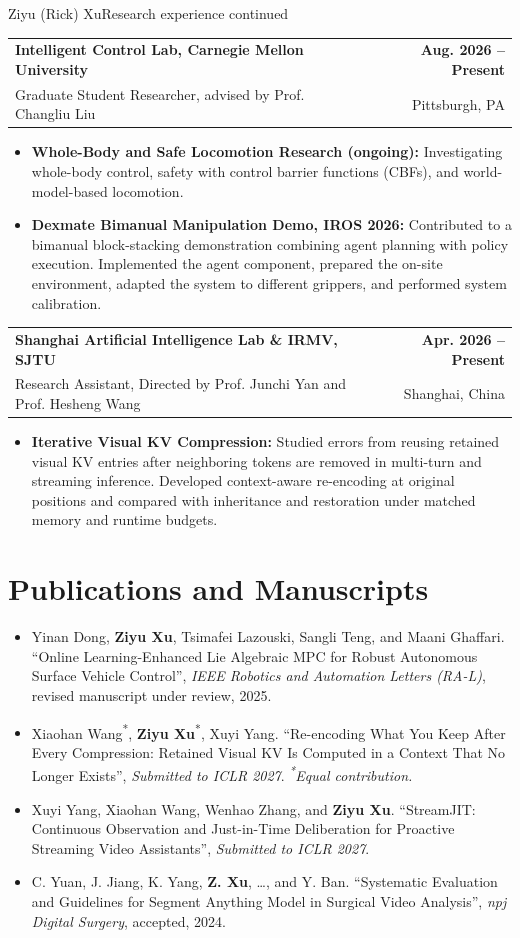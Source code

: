 \documentclass[11pt,letterpaper]{article}
\makeatletter
\newcommand{\resumeSubheading}[4]{
    \begin{tabularx}{\textwidth}{@{}Xr@{}}
        \textbf{#1} & \textbf{#2} \\
        #3 & #4 \\
    \end{tabularx}
}
\newcommand{\resumeItem}[1]{
    \item #1
}
\makeatother
\begin{document}
\newpage
{\small Ziyu (Rick) Xu}\hfill{\small Research experience continued}
\vspace{4pt}
\resumeSubheading
{Intelligent Control Lab, Carnegie Mellon University}
{Aug. 2026 -- Present}
{\hspace*{1.4em}Graduate Student Researcher, advised by Prof. Changliu Liu}
{Pittsburgh, PA}
\begin{itemize}[leftmargin=2.4em, itemsep=0.5pt, topsep=0pt]
\small
\resumeItem{\textbf{Whole-Body and Safe Locomotion Research (ongoing):} Investigating whole-body control, safety with control barrier functions (CBFs), and world-model-based locomotion.}
\resumeItem{\textbf{Dexmate Bimanual Manipulation Demo, IROS 2026:} Contributed to a bimanual block-stacking demonstration combining agent planning with policy execution. Implemented the agent component, prepared the on-site environment, adapted the system to different grippers, and performed system calibration.}
\end{itemize}

\resumeSubheading
{Shanghai Artificial Intelligence Lab \& IRMV, SJTU }
{Apr. 2026 -- Present}
{\hspace*{1.4em}Research Assistant, Directed by Prof. Junchi Yan and Prof. Hesheng Wang}
{Shanghai, China}
\begin{itemize}[leftmargin=2.4em, itemsep=0.5pt, topsep=0pt]
\small
\resumeItem{\textbf{Iterative Visual KV Compression:} Studied errors from reusing retained visual KV entries after neighboring tokens are removed in multi-turn and streaming inference. Developed context-aware re-encoding at original positions and compared with inheritance and restoration under matched memory and runtime budgets.}
\end{itemize}

\section*{Publications and Manuscripts}
\begin{itemize}[leftmargin=1.4em,itemsep=3pt,topsep=2pt]
\small
\item Yinan Dong, \textbf{Ziyu Xu}, Tsimafei Lazouski, Sangli Teng, and Maani Ghaffari.      ``Online Learning-Enhanced Lie Algebraic MPC for Robust Autonomous Surface Vehicle Control'',      \textit{IEEE Robotics and Automation Letters (RA-L)}, revised manuscript under review, 2025.
\item Xiaohan Wang\textsuperscript{*}, \textbf{Ziyu Xu}\textsuperscript{*}, Xuyi Yang.      ``Re-encoding What You Keep After Every Compression: Retained Visual KV Is Computed in a Context That No Longer Exists'',      \textit{Submitted to ICLR 2027}. \textit{\textsuperscript{*}Equal contribution.}
\item Xuyi Yang, Xiaohan Wang, Wenhao Zhang, and \textbf{Ziyu Xu}.      ``StreamJIT: Continuous Observation and Just-in-Time Deliberation for Proactive Streaming Video Assistants'',      \textit{Submitted to ICLR 2027}.
\item C. Yuan, J. Jiang, K. Yang, \textbf{Z. Xu}, \ldots, and Y. Ban.      ``Systematic Evaluation and Guidelines for Segment Anything Model in Surgical Video Analysis'',      \textit{npj Digital Surgery}, accepted, 2024.
\end{itemize}
\end{document}
